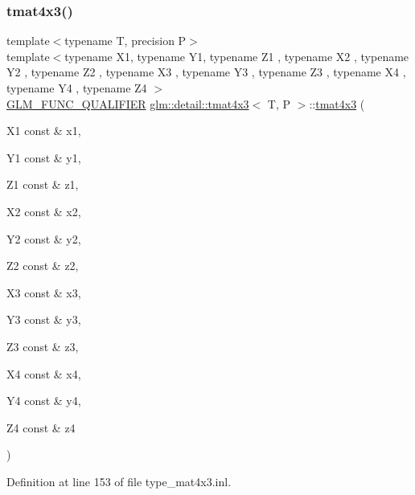 \subsubsection{\texorpdfstring{tmat4x3()}{tmat4x3()}\hspace{0.1cm}{\footnotesize\ttfamily [20/22]}}
{\footnotesize\ttfamily template$<$typename T, precision P$>$ \\
template$<$typename X1, typename Y1, typename Z1 , typename X2 , typename Y2 , typename Z2 , typename X3 , typename Y3 , typename Z3 , typename X4 , typename Y4 , typename Z4 $>$ \\
\hyperlink{setup_8hpp_a33fdea6f91c5f834105f7415e2a64407}{G\+L\+M\+\_\+\+F\+U\+N\+C\+\_\+\+Q\+U\+A\+L\+I\+F\+I\+ER} \hyperlink{structglm_1_1detail_1_1tmat4x3}{glm\+::detail\+::tmat4x3}$<$ T, P $>$\+::\hyperlink{structglm_1_1detail_1_1tmat4x3}{tmat4x3} (\begin{DoxyParamCaption}\item[{X1 const \&}]{x1,  }\item[{Y1 const \&}]{y1,  }\item[{Z1 const \&}]{z1,  }\item[{X2 const \&}]{x2,  }\item[{Y2 const \&}]{y2,  }\item[{Z2 const \&}]{z2,  }\item[{X3 const \&}]{x3,  }\item[{Y3 const \&}]{y3,  }\item[{Z3 const \&}]{z3,  }\item[{X4 const \&}]{x4,  }\item[{Y4 const \&}]{y4,  }\item[{Z4 const \&}]{z4 }\end{DoxyParamCaption})}



Definition at line 153 of file type\+\_\+mat4x3.\+inl.

\mbox{\label{structglm_1_1detail_1_1tmat4x3_a855ee129fe5ef20aa994a3121996b09a}} 
